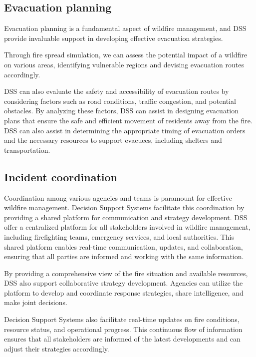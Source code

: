 \documentclass[
  12 pt,
]{Nemilov}
\begin{document}
\subsection{Evacuation planning}\label{evacuation-planning}

Evacuation planning is a fundamental aspect of wildfire management, and DSS provide invaluable support in developing effective evacuation strategies.

Through fire spread simulation, we can assess the potential impact of a wildfire on various areas, identifying vulnerable regions and devising evacuation routes accordingly.

DSS can also evaluate the safety and accessibility of evacuation routes by considering factors such as road conditions, traffic congestion, and potential obstacles. By analyzing these factors, DSS can assist in designing evacuation plans that ensure the safe and efficient movement of residents away from the fire. DSS can also assist in determining the appropriate timing of evacuation orders and the necessary resources to support evacuees, including shelters and transportation.

\subsection{Incident coordination}\label{incident-coordination}

Coordination among various agencies and teams is paramount for effective wildfire management. Decision Support Systems facilitate this coordination by providing a shared platform for communication and strategy development. DSS offer a centralized platform for all stakeholders involved in wildfire management, including firefighting teams, emergency services, and local authorities. This shared platform enables real-time communication, updates, and collaboration, ensuring that all parties are informed and working with the same information.

By providing a comprehensive view of the fire situation and available resources, DSS also support collaborative strategy development. Agencies can utilize the platform to develop and coordinate response strategies, share intelligence, and make joint decisions.

Decision Support Systems also facilitate real-time updates on fire conditions, resource status, and operational progress. This continuous flow of information ensures that all stakeholders are informed of the latest developments and can adjust their strategies accordingly.
\end{document}
